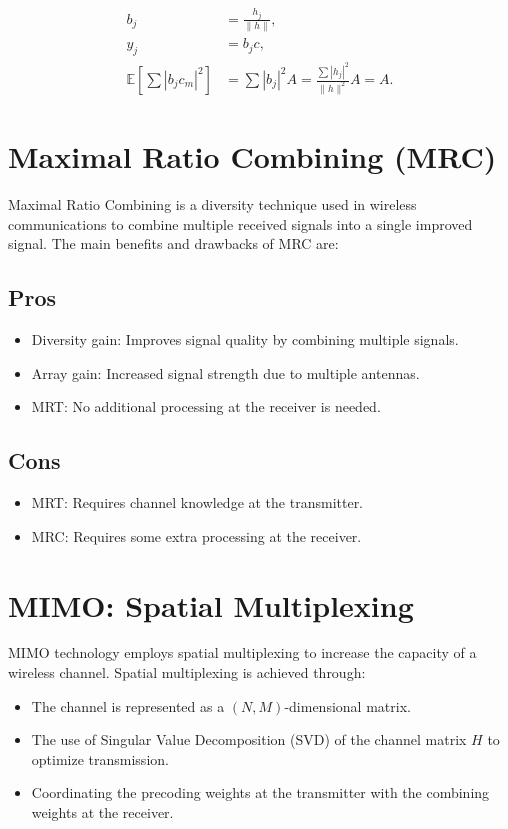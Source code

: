 \begin{align*}
b_j &= \frac{h_j}{\|h\|}, \\
y_j &= b_j c, \\
\mathbb{E} \left[ \sum |b_j c_m|^2 \right] &= \sum |b_j|^2 A = \frac{\sum |h_j|^2}{\|h\|^2} A = A.
\end{align*}

\section*{Maximal Ratio Combining (MRC)}

Maximal Ratio Combining is a diversity technique used in wireless communications to combine multiple received signals into a single improved signal. The main benefits and drawbacks of MRC are:

\subsection*{Pros}
\begin{itemize}
\item Diversity gain: Improves signal quality by combining multiple signals.
\item Array gain: Increased signal strength due to multiple antennas.
\item MRT: No additional processing at the receiver is needed.
\end{itemize}

\subsection*{Cons}
\begin{itemize}
\item MRT: Requires channel knowledge at the transmitter.
\item MRC: Requires some extra processing at the receiver.
\end{itemize}

\section*{MIMO: Spatial Multiplexing}

MIMO technology employs spatial multiplexing to increase the capacity of a wireless channel. Spatial multiplexing is achieved through:

\begin{itemize}
\item The channel is represented as a \((N, M)\)-dimensional matrix.
\item The use of Singular Value Decomposition (SVD) of the channel matrix \( H \) to optimize transmission.
\item Coordinating the precoding weights at the transmitter with the combining weights at the receiver.
\end{itemize}

